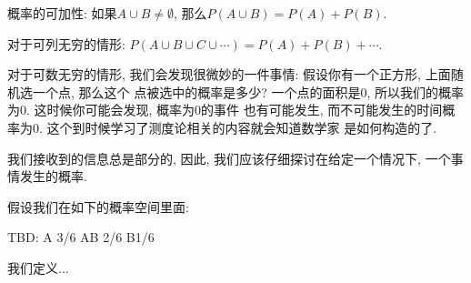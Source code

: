 \begin{axiom}
    概率的可加性: 如果$A\cup B\neq \emptyset$, 那么$P(A\cup B)=P(A)+P(B)$. 

    对于可列无穷的情形: $P(A\cup B\cup C\cup\cdots)=P(A)+P(B)+\cdots$. 
\end{axiom}
对于可数无穷的情形, 我们会发现很微妙的一件事情: 假设你有一个正方形, 上面随机选一个点, 那么这个
点被选中的概率是多少? 一个点的面积是0, 所以我们的概率为0. 这时候你可能会发现, 概率为0的事件
也有可能发生, 而不可能发生的时间概率为0. 这个到时候学习了测度论相关的内容就会知道数学家
是如何构造的了. 

我们接收到的信息总是部分的, 因此, 我们应该仔细探讨在给定一个情况下, 一个事情发生的概率. 

假设我们在如下的概率空间里面: 

TBD: A 3/6 AB 2/6 B1/6

我们定义...